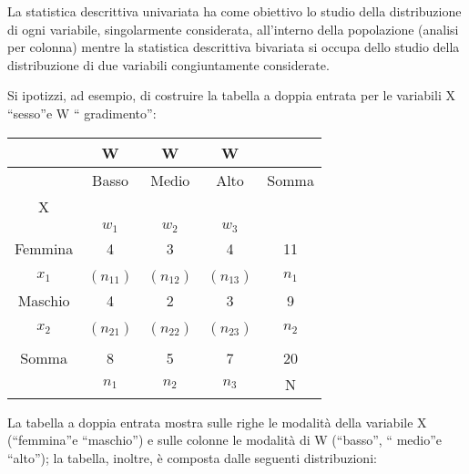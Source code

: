 \vspace{12pt}
La statistica descrittiva univariata ha come obiettivo lo studio della 
distribuzione di ogni variabile, singolarmente considerata, all'interno 
della popolazione (analisi per colonna) mentre la statistica descrittiva 
bivariata si occupa dello studio della distribuzione di due variabili 
congiuntamente considerate.

Si ipotizzi, ad esempio, di costruire la tabella a doppia entrata per le 
variabili X \textquotedblleft sesso\textquotedblright e W \textquotedblleft 
gradimento\textquotedblright:

\begin{tabular}{|c|c|c|c|c|}
\hline
 & W & W & W & \\
\hline
 & Basso & Medio & Alto & Somma\\
X &  & & &\\
 & $w_1$ & $w_2$ &  $w_3$ & \\
 \hline
 Femmina & 4 & 3 & 4 & 11\\
   &  & & &\\
 $x_1$ & $(n_{11})$ & $(n_{12})$ &  $(n_{13})$ & $n_1$ \\
  \hline
   Maschio & 4 & 2 & 3 & 9\\
   &  & & &\\
   $x_2$ & $(n_{21})$ & $(n_{22})$ &  $(n_{23})$ & $n_2$ \\
   \hline
 &  &  &  & \\
 Somma  & 8 & 5& 7&20\\
    & $n_{1}$ & $n_{2}$ &  $n_{3}$ & N \\   
  
  \hline
\end{tabular}

\vspace{6pt}
La tabella a doppia entrata mostra sulle righe le modalità della 
variabile X (\textquotedblleft femmina\textquotedblright e 
\textquotedblleft maschio\textquotedblright) e sulle colonne le modalità di 
W (\textquotedblleft basso\textquotedblright, \textquotedblleft 
medio\textquotedblright e \textquotedblleft alto\textquotedblright); la 
tabella, inoltre, è composta dalle seguenti distribuzioni:  

